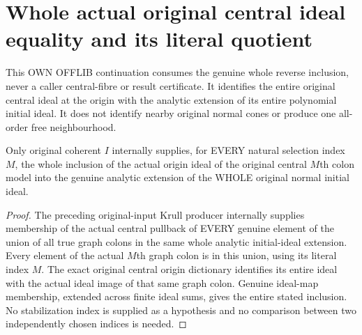 \section{Whole actual original central ideal equality and its literal quotient}
This OWN OFFLIB continuation consumes the genuine whole reverse inclusion, never a caller central-fibre or result certificate. It identifies the entire original central ideal at the origin with the analytic extension of its entire polynomial initial ideal. It does not identify nearby original normal cones or produce one all-order free neighbourhood.

\begin{lemma}
\label{hir:relative-normal-graph-central-all-selected-colon-reverse}
\leanok
Only original coherent $I$ internally supplies, for EVERY natural selection index $M$, the whole inclusion of the actual origin ideal of the original central $M$th colon model into the genuine analytic extension of the WHOLE original normal initial ideal.
\end{lemma}
\begin{proof}
The preceding original-input Krull producer internally supplies membership of the actual central pullback of EVERY genuine element of the union of all true graph colons in the same whole analytic initial-ideal extension. Every element of the actual $M$th graph colon is in this union, using its literal index $M$. The exact original central origin dictionary identifies its entire ideal with the actual ideal image of that same graph colon. Genuine ideal-map membership, extended across finite ideal sums, gives the entire stated inclusion. No stabilization index is supplied as a hypothesis and no comparison between two independently chosen indices is needed.
\end{proof}


